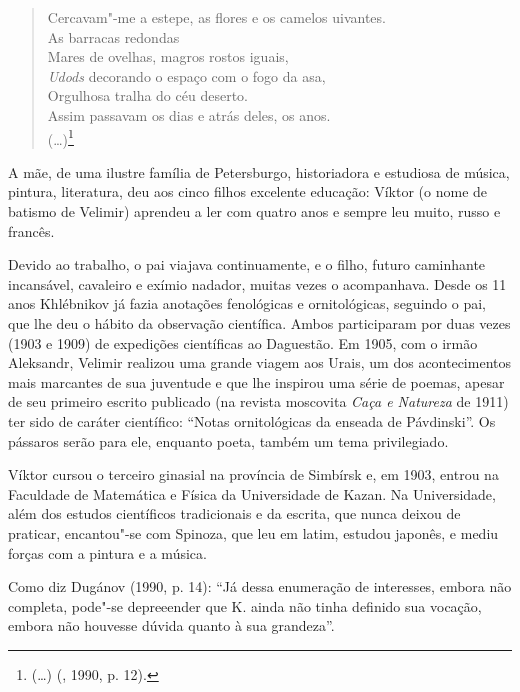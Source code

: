 \begin{verse}
Cercavam"-me a estepe, as flores e os \qb{}camelos uivantes. \\
As barracas redondas \\
Mares de ovelhas, magros rostos iguais, \\
\emph{Udods} decorando o espaço com o fogo da \qb{}asa, \\
Orgulhosa tralha do céu deserto. \\
Assim passavam os dias e atrás deles, os anos. \\
(\ldots{})\footnote{{} (\ldots{}) (, 1990, p. 12).}
\end{verse}

A mãe, de uma ilustre família de Petersburgo, historiadora e estudiosa
de música, pintura, literatura, deu aos cinco filhos excelente educação:
Víktor (o nome de batismo de Velimir) aprendeu a ler com quatro
anos e sempre leu muito, russo e francês.

Devido ao trabalho, o pai viajava continuamente, e o filho, futuro
caminhante incansável, cavaleiro e exímio nadador, muitas vezes o
acompanhava. Desde os 11 anos Khlébnikov já fazia anotações fenológicas e
ornitológicas, seguindo o pai, que lhe deu o hábito da observação
científica. Ambos participaram por duas vezes (1903 e 1909) de
expedições científicas ao Daguestão. Em 1905, com o irmão Aleksandr,
Velimir realizou uma grande viagem aos Urais, um dos acontecimentos mais
marcantes de sua juventude e que lhe inspirou uma série de poemas,
apesar de seu primeiro escrito publicado (na revista moscovita
\emph{Caça e Natureza} de 1911) ter sido de caráter científico: ``Notas
ornitológicas da enseada de Pávdinski''. Os pássaros serão para ele,
enquanto poeta, também um tema privilegiado.

Víktor cursou o terceiro ginasial na província de Simbírsk e, em 1903,
entrou na Faculdade de Matemática e Física da Universidade de Kazan. Na
Universidade, além dos estudos científicos tradicionais e da escrita,
que nunca deixou de praticar, encantou"-se com Spinoza, que leu em latim,
estudou japonês, e mediu forças com a pintura e a música.

Como diz Dugánov (1990, p. 14): ``Já dessa enumeração de interesses, embora não
completa, pode"-se depreeender que K. ainda não tinha definido sua
vocação, embora não houvesse dúvida quanto à sua grandeza''.

